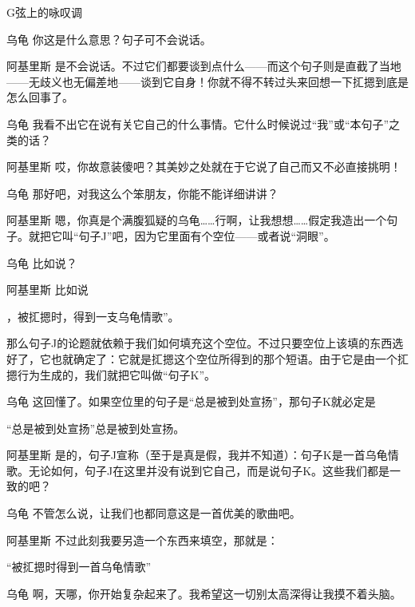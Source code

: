 \begin{dialog}{G弦上的咏叹调}
\begin{dialogue}
\item[乌龟]你这是什么意思？句子可不会说话。

\item[阿基里斯]是不会说话。不过它们都要谈到点什么——而这个句子则是直截了当地——无歧义也无偏差地——谈到它自身！你就不得不转过头来回想一下㧟摁到底是怎么回事了。

\item[乌龟]我看不出它在说有关它自己的什么事情。它什么时候说过“我”或“本句子”之类的话？

\item[阿基里斯]哎，你故意装傻吧？其美妙之处就在于它说了自己而又不必直接挑明！

\item[乌龟]那好吧，对我这么个笨朋友，你能不能详细讲讲？

\item[阿基里斯]嗯，你真是个满腹狐疑的乌龟……行啊，让我想想……假定我造出一个句子。就把它叫“句子J”吧，因为它里面有个空位——或者说“洞眼”。

\item[乌龟]比如说？

\item[阿基里斯]比如说
\begin{block}
\underline{\ccwd}，被㧟摁时，得到一支乌龟情歌”。
\end{block}

那么句子J的论题就依赖于我们如何填充这个空位。不过只要空位上该填的东西选好了，它也就确定了：它就是㧟摁这个空位所得到的那个短语。由于它是由一个㧟摁行为生成的，我们就把它叫做“句子K”。

\item[乌龟]这回懂了。如果空位里的句子是“总是被到处宣扬”，那句子K就必定是
\begin{block}
“总是被到处宣扬”总是被到处宣扬。
\end{block}

\item[阿基里斯]是的，句子J宣称（至于是真是假，我并不知道）：句子K是一首乌龟情歌。无论如何，句子J在这里并没有说到它自己，而是说句子K。这些我们都是一致的吧？

\item[乌龟]不管怎么说，让我们也都同意这是一首优美的歌曲吧。

\item[阿基里斯]不过此刻我要另造一个东西来填空，那就是：
\begin{block}
“被㧟摁时得到一首乌龟情歌”
\end{block}

\item[乌龟]啊，天哪，你开始复杂起来了。我希望这一切别太高深得让我摸不着头脑。


\end{dialogue}
\end{dialog}
